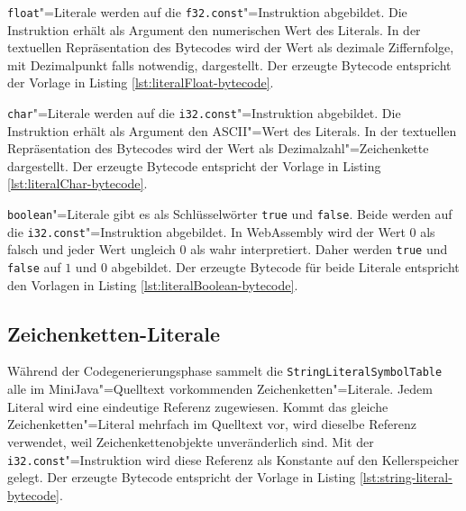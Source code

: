 \lstinline{float}"=Literale werden auf die \lstinline{f32.const}"=Instruktion abgebildet. Die Instruktion erhält als Argument den numerischen Wert des Literals. In der textuellen Repräsentation des Bytecodes wird der Wert als dezimale Ziffernfolge, mit Dezimalpunkt falls notwendig, dargestellt. Der erzeugte Bytecode entspricht der Vorlage in Listing \ref{lst:literalFloat-bytecode}.



\lstinline{char}"=Literale werden auf die \lstinline{i32.const}"=Instruktion abgebildet. Die Instruktion erhält als Argument den ASCII"=Wert des Literals. In der textuellen Repräsentation des Bytecodes wird der Wert als Dezimalzahl"=Zeichenkette dargestellt. Der erzeugte Bytecode entspricht der Vorlage in Listing \ref{lst:literalChar-bytecode}.



\pagebreak
\lstinline{boolean}"=Literale gibt es als Schlüsselwörter \lstinline{true} und \lstinline{false}. Beide werden auf die \lstinline{i32.const}"=Instruktion abgebildet. In WebAssembly wird der Wert $0$ als falsch und jeder Wert ungleich $0$ als wahr interpretiert. Daher werden \lstinline{true} und \lstinline{false} auf $1$ und $0$ abgebildet. Der erzeugte Bytecode für beide Literale entspricht den Vorlagen in Listing \ref{lst:literalBoolean-bytecode}.



\subsection{Zeichenketten-Literale}
\label{subsec:Zeichenketten-Literale}

Während der Codegenerierungsphase sammelt die \lstinline{StringLiteralSymbolTable} alle im MiniJava"=Quelltext vorkommenden Zeichenketten"=Literale. Jedem Literal wird eine eindeutige Referenz zugewiesen. Kommt das gleiche Zeichenketten"=Literal mehrfach im Quelltext vor, wird dieselbe Referenz verwendet, weil Zeichenkettenobjekte unveränderlich sind. Mit der \lstinline{i32.const}"=Instruktion wird diese Referenz als Konstante auf den Kellerspeicher gelegt. Der erzeugte Bytecode entspricht der Vorlage in Listing \ref{lst:string-literal-bytecode}.

